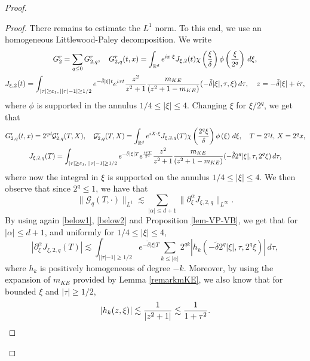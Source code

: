 \documentclass[11pt]{amsart}
\numberwithin{equation}{section}
\newcommand{\eps}{\varepsilon}
\begin{document}
\begin{proof}
\begin{proof}
   There remains to estimate the $L^1$ norm.
    To this end, we use an homogeneous Littlewood-Paley decomposition. We write 
   \begin{multline}
   \label{G2rLP} G_{2}^r = \sum_{q \leq 0} G^r_{2,q}, \quad
    G^r_{2, q}(t,x)= \int_{\mathbb{R}^d}  e^{ i x \cdot \xi}J_{\xi, 2} (t) \chi \left( { \xi \over \delta} \right)   \phi \left( { \xi \over 2^q} \right)\, d \xi,  \\
    J_{\xi, 2}(t)= 
    \int_{|\tau | \geq \eps_{1}, \,  || \tau | - 1| \geq 1/2 }e^{-  \tilde \delta |\xi| t}  e^{i \tau t}  {z^2 \over z^2+1}   { m_{KE} \over (z^2+ 1 - m_{KE})}(- \tilde \delta | \xi|, \tau, \xi)\, d\tau, \quad z= - \tilde \delta |\xi|  + i \tau,
    \end{multline}
    where $\phi$ is supported in the annulus $1/4 \leq | \xi | \leq 4$.
    Changing $\xi$  for  $\xi/ 2^q$, we get that
\begin{multline}
\label{G2-G2-0}
 G^r_{2, q}(t,x) = 2^{qd} \mathcal{G}^r_{2,q} (T, X), \quad \mathcal{G}^r_{2,q} (T, X)
  = \int_{\mathbb{R}^d}  e^{i X \cdot \xi} J_{\xi, 2,q} (T)   \chi \left( { 2^q  \xi \over \delta} \right)   \phi \left(  \xi \right)\, d \xi, 
  \quad  T= 2^qt, \, X= 2^q x,\\
   J_{\xi, 2, q}(T)=
    \int_{ |\tau | \geq \eps_{1}, \, || \tau | - 1| \geq 1/2 }e^{-  \tilde \delta |\xi| T}  e^{i \tau T \over 2^q}  {z^2 \over z^2+1}   { m_{KE} \over (z^2+ 1 - m_{KE})}(
    - \tilde \delta 2^q | \xi |,  \tau,  
    2^q  \xi )\, d\tau ,
    \end{multline} 
    where now the integral in $\xi$ is supported on the annulus $ 1/4 \leq | \xi | \leq 4.$
    We then observe that since $2^q \leq 1$, we have that 
    $$ \| \mathcal{G}_{q} (T, \cdot)\|_{L^1}
     \lesssim  \sum_{ | \alpha | \leq d+1}   \| \partial_{\xi}^\alpha J_{\xi, 2, q}\|_{L^\infty}.$$
      By using again \eqref{below1}, \eqref{below2} and Proposition \ref{lem-VP-VB}, we get
       that  for $|\alpha|\leq d+1$, and uniformly for $1/4 \leq | \xi | \leq 4$, 
       $$    | \partial_{\xi}^\alpha J_{\xi, 2, q}(T) | \lesssim  \int_{ || \tau | - 1| \geq 1/2 }e^{-  \tilde \delta |\xi| T} 
         \sum_{k \leq | \alpha |} 2^{qk} | h_{k} ( - \tilde \delta 2^q | \xi |,  \tau,  
    2^q  \xi )  |\, d\tau,
    $$
    where $h_{k}$ is  positively homogeneous of degree $-k$. Moreover, by using the expansion  of $m_{KE}$ provided by 
    Lemma \ref{remarkmKE}, we also know that 
     for bounded $ \xi$ and $|\tau| \geq 1/2$, 
   $$| h_{k}(z, \xi) | \lesssim  { 1 \over |z^2 +  1 |} \lesssim { 1 \over 1 + \tau^2} .$$

\end{proof}
\end{proof}
\end{document}
